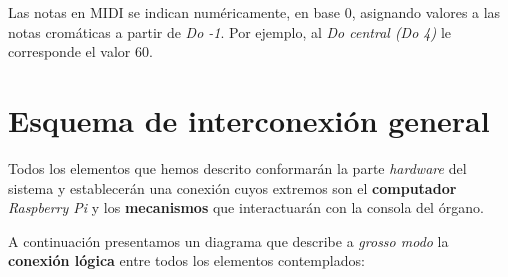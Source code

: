 Las notas en \acrshort{MIDI} se indican numéricamente, en base 0, asignando valores a las notas cromáticas a partir de \textit{Do -1}. Por ejemplo, al \textit{Do central (Do 4)} le corresponde el valor 60.

\newpage

\section{Esquema de interconexión general}

Todos los elementos que hemos descrito conformarán la parte \textit{hardware} del sistema y establecerán una conexión cuyos extremos son el \textbf{computador} \textit{Raspberry Pi} y los \textbf{mecanismos} que interactuarán con la consola del órgano.

A continuación presentamos un diagrama que describe a \textit{grosso modo} la \textbf{conexión lógica} entre todos los elementos contemplados:

\smallskip

